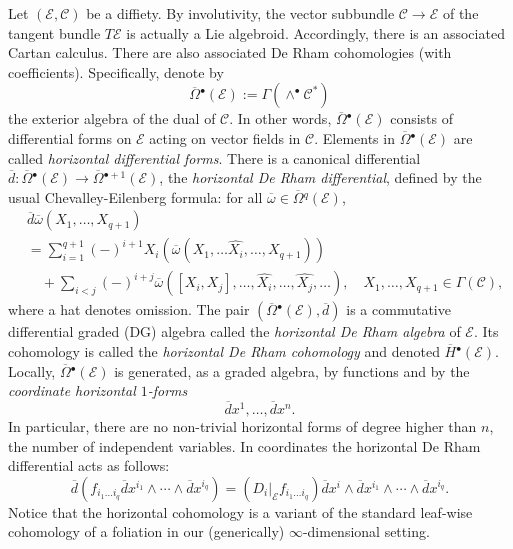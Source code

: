 \documentclass{conm-p-l}
\theoremstyle{definition}
\theoremstyle{remark}
\numberwithin{equation}{section}
\begin{document}
Let $(\mathscr E, \mathscr C)$ be a diffiety.  By involutivity, the vector subbundle $\mathscr C \to \mathscr E$ of the tangent bundle $T \mathscr E$ is actually a Lie algebroid. Accordingly, there is an associated Cartan calculus. There are also associated De Rham cohomologies (with coefficients). Specifically,    denote by
\[
\overline \Omega{}^\bullet (\mathscr E) := \Gamma (\wedge^\bullet \mathscr C^\ast)
\]
the exterior algebra of the dual of $\mathscr C$. In other words, $\overline \Omega{}^\bullet (\mathscr E)$ consists of differential forms on $\mathscr E$ acting on vector fields in $\mathscr C$. Elements in $\overline \Omega{}^\bullet (\mathscr E)$ are called \emph{horizontal differential forms}. There is a canonical differential $\overline d : \overline \Omega{}^\bullet (\mathscr E) \to \overline \Omega{}^{\bullet +1} (\mathscr E)$, the \emph{horizontal De Rham differential}, defined by the usual Chevalley-Eilenberg formula: for all $\overline \omega \in \overline \Omega{}^q (\mathscr E)$,
\[
\begin{aligned}
& \overline d \overline \omega (X_1, \ldots, X_{q+1}) \\
& = \sum_{i = 1}^{q+1} (-)^{i+1}X_i \left( \overline \omega (X_1, \ldots \widehat{X_i}, \ldots, X_{q+1})\right) \\
& \quad + \sum_{i < j} (-)^{i+j}\overline \omega  \left( [X_i, X_j], \ldots, \widehat{X_i}, \ldots, \widehat{X_j}, \ldots \right), \quad X_1, \ldots, X_{q+1} \in \Gamma (\mathscr C),
\end{aligned}
\]
where a hat denotes omission. The pair $(\overline \Omega{}^\bullet (\mathscr E), \overline d)$ is a commutative differential graded (DG) algebra called the \emph{horizontal De Rham algebra} of $\mathscr E$. Its cohomology is called the \emph{horizontal De Rham cohomology} and denoted $\overline H{}^\bullet (\mathscr E)$. Locally, $\overline \Omega{}^\bullet (\mathscr E)$ is generated, as a graded algebra, by functions and by the \emph{coordinate horizontal $1$-forms}
\[
\overline d x^1, \ldots, \overline d x^n.
\]
In particular, there are no non-trivial horizontal forms of degree higher than $n$, the number of independent variables. In coordinates the horizontal De Rham differential acts as follows:
\[
\overline d \left( f_{i_1 \ldots i_q} \overline d x^{i_1} \wedge \cdots \wedge \overline d x^{i_q} \right) = \left(D_i |_{\mathscr E} f_{i_1 \ldots i_q}\right) \overline d x^i \wedge \overline d x^{i_1} \wedge \cdots \wedge \overline d x^{i_q}.
\]
Notice that the horizontal cohomology is a variant of the standard leaf-wise cohomology of a foliation in our (generically) $\infty$-dimensional setting.
\end{document}
